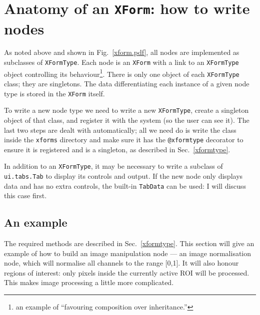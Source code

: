 

\section{Anatomy of an \texttt{XForm}: how to write nodes}
\label{writingnodes}
As noted above and shown in Fig.~\ref{xform.pdf}, all nodes are 
implemented as subclasses of \texttt{XFormType}. Each node 
is an \texttt{XForm} with a link to an \texttt{XFormType} object
controlling its behaviour\footnote{an example of ``favouring
composition over inheritance.''}.
There is only one object of each \texttt{XFormType} class; they
are singletons. The data differentiating each instance of 
a given node type is stored in the \texttt{XForm} itself.

To write a new node type we need to write a new \texttt{XFormType},
create a singleton object of that class, and register it with the system
(so the user can see it). The last two steps are dealt with automatically;
all we need do is write the class inside the \texttt{xforms} directory
and make sure it has the \texttt{@xformtype} decorator to ensure
it is registered and is a singleton, as described in 
Sec.~\ref{xformtype}.

In addition to an \texttt{XFormType}, it may be necessary to write
a subclass of \texttt{ui.tabs.Tab} to display its controls and output.
If the new node only displays
data and has no extra controls, the built-in \texttt{TabData}
can be used: I will discuss this case first.

\subsection{An example}
The required methods are described in Sec.~\ref{xformtype}. This
section will give an example of how to build an image manipulation
node --- an image normalisation node, which will normalise all channels
to the range [0,1]. It will also honour regions of interest:
only pixels inside the currently active ROI will be processed. This makes
image processing a little more complicated.

